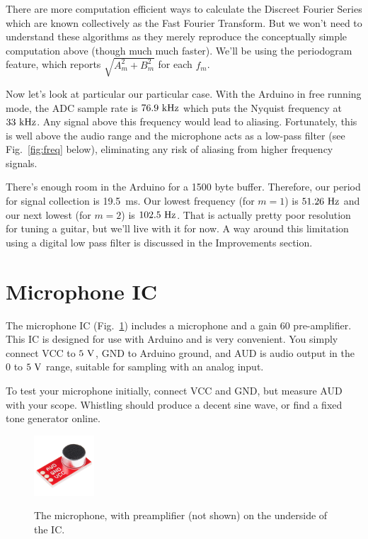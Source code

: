 \documentclass[12pt]{article}
\begin{document}
There are more computation efficient ways to calculate the Discreet Fourier Series which are known collectively as the Fast Fourier Transform.   But we won't need to understand these algorithms as they merely reproduce the conceptually simple computation above (though much much faster).  We'll be using the periodogram feature, which reports $\sqrt{A_m^2 + B_m^2}$ for each $f_m$.

Now let's look at particular our particular case.  With the Arduino in free running mode, the ADC sample rate is $76.9~\rm kHz$ which puts the Nyquist frequency at $33~\rm kHz$.  Any signal above this frequency would lead to aliasing.  Fortunately, this is well above the audio range and the microphone acts as a low-pass filter (see Fig.~\ref{fig:freq} below), eliminating any risk of aliasing from higher frequency signals.

There's enough room in the Arduino for a 1500 byte buffer.  Therefore, our period for signal collection is 
{19.5~\rm ms}.  Our lowest frequency (for $m=1$) is $51.26~\rm Hz$ and our next lowest (for $m=2$) is $102.5~\rm Hz$.   That is actually pretty poor resolution for tuning a guitar, but we'll live with it for now.  A way around this limitation using a digital low pass filter is discussed in the Improvements section.

\section{Microphone IC}

The microphone IC (Fig.~\ref{fig:mic}) includes a microphone and a gain 60 pre-amplifier.  This IC is designed for use with Arduino and is very convenient.  You simply connect VCC to $5~\rm V$, GND to Arduino ground, and AUD is audio output in the $0$ to $5~\rm V$ range, suitable for sampling with an analog input.

To test your microphone initially, connect VCC and GND, but measure AUD with your scope.  Whistling should produce a decent sine wave, or find a fixed tone generator online.

\begin{figure}[htbp]
\begin{center}
{\includegraphics[width=0.20\textwidth]{figs/mic.jpg}}
\end{center}
\caption{\label{fig:mic} The microphone, with preamplifier (not shown) on the underside of the IC.}
\end{figure}
\end{document}
